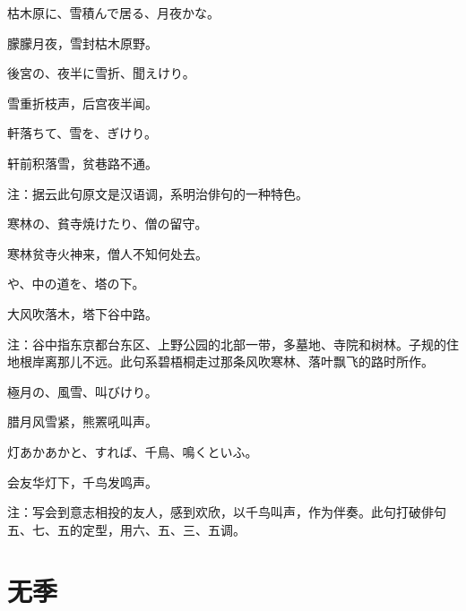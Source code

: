 \begin{haiku}
    {\FH 枯木原に、雪積んで居る、月夜かな。}

    {\FK 朦朦月夜，雪封枯木原野。}
\end{haiku}

\begin{haiku}
    {\FH 後宮の、夜半に雪折、聞えけり。}

    {\FK 雪重折枝声，后宫夜半闻。}
\end{haiku}

\begin{haiku}
    {\FH 軒落ちて、雪を、ぎけり。}

    {\FK 轩前积落雪，贫巷路不通。}

    {\FT 注：据云此句原文是汉语调，系明治俳句的一种特色。}
\end{haiku}

\begin{haiku}
    {\FH 寒林の、貧寺焼けたり、僧の留守。}

    {\FK 寒林贫寺火神来，僧人不知何处去。}
\end{haiku}

\begin{haiku}
    {\FH {}や、中の道を、塔の下。}

    {\FK 大风吹落木，塔下谷中路。}

    {\FT 注：谷中指东京都台东区、上野公园的北部一带，多墓地、寺院和树林。子规的住地根岸离那儿不远。此句系碧梧桐走过那条风吹寒林、落叶飘飞的路时所作。}
\end{haiku}

\begin{haiku}
    {\FH 極月の、風雪、叫びけり。}

    {\FK 腊月风雪紧，熊罴吼叫声。}
\end{haiku}

\begin{haiku}
    {\FH 灯あかあかと、すれば、千鳥、鳴くといふ。}

    {\FK 会友华灯下，千鸟发鸣声。}

    {\FT 注：写会到意志相投的友人，感到欢欣，以千鸟叫声，作为伴奏。此句打破俳句五、七、五的定型，用六、五、三、五调。}
\end{haiku}

\section{\FK 无季}


